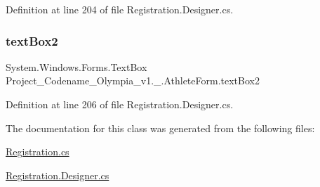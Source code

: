 Definition at line 204 of file Registration.\+Designer.\+cs.

\mbox{\label{classProject__Codename__Olympia__v1_1_1__0_1_1AthleteForm_a0880cf44d758bf012c8bac388a2c3533}} 
\subsubsection{\texorpdfstring{text\+Box2}{textBox2}}
{\footnotesize\ttfamily System.\+Windows.\+Forms.\+Text\+Box Project\+\_\+\+Codename\+\_\+\+Olympia\+\_\+v1.\+\_.\+Athlete\+Form.\+text\+Box2\hspace{0.3cm}{\ttfamily [private]}}



Definition at line 206 of file Registration.\+Designer.\+cs.



The documentation for this class was generated from the following files\+:\begin{DoxyCompactItemize}
\item 
\hyperlink{Registration_8cs}{Registration.\+cs}\item 
\hyperlink{Registration_8Designer_8cs}{Registration.\+Designer.\+cs}\end{DoxyCompactItemize}
